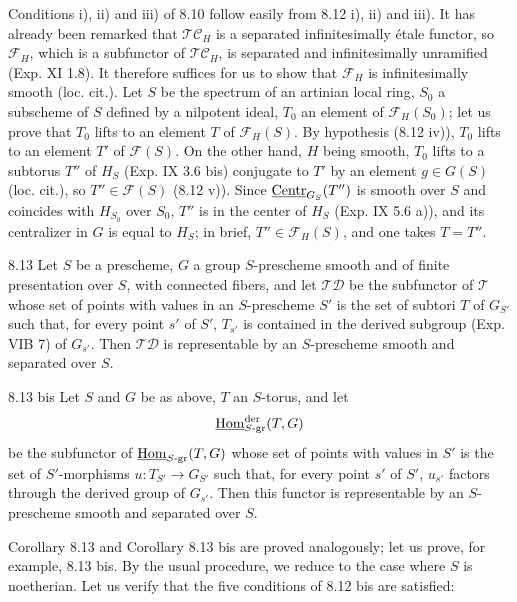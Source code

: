 Conditions i), ii) and iii) of 8.10 follow easily from 8.12 i), ii) and iii). It has already been remarked that $\mathscr{TC}_H$ is a separated infinitesimally étale functor, so $\mathscr F_H$, which is a subfunctor of $\mathscr{TC}_H$, is separated and infinitesimally unramified (Exp. XI 1.8). It therefore suffices for us to show that $\mathscr F_H$ is infinitesimally smooth (loc. cit.). Let $S$ be the spectrum of an artinian local ring, $S_0$ a subscheme of $S$ defined by a nilpotent ideal, $T_0$ an element of $\mathscr F_H(S_0)$; let us prove that $T_0$ lifts to an element $T$ of $\mathscr F_H(S)$. By hypothesis (8.12 iv)), $T_0$ lifts to an element $T'$ of $\mathscr F(S)$. On the other hand, $H$ being smooth, $T_0$ lifts to a subtorus $T''$ of $H_S$ (Exp. IX 3.6 bis) conjugate to $T'$ by an element $g\in G(S)$ (loc. cit.), so $T''\in\mathscr F(S)$ (8.12 v)). Since $\underline{\mathrm{Centr}}_{G_S}(T'')$ is smooth over $S$ and coincides with $H_{S_0}$ over $S_0$, $T''$ is in the center of $H_S$ (Exp. IX 5.6 a)), and its centralizer in $G$ is equal to $H_S$; in brief, $T''\in\mathscr F_H(S)$, and one takes $T=T''$.
\begin{corollary}{8.13}\label{XV.8.13}
Let $S$ be a prescheme, $G$ a group $S$-prescheme smooth and of finite presentation over $S$, with connected fibers, and let $\mathscr{TD}$ be the subfunctor of $\mathscr T$ whose set of points with values in an $S$-prescheme $S'$ is the set of subtori $T$ of $G_{S'}$ such that, for every point $s'$ of $S'$, $T_{s'}$ is contained in the derived subgroup (Exp. VIB 7) of $G_{s'}$. Then $\mathscr{TD}$ is representable by an $S$-prescheme smooth and separated over $S$.
\end{corollary}
\begin{corollary}{8.13 bis}\label{XV.8.13bis}
Let $S$ and $G$ be as above, $T$ an $S$-torus, and let
\[
\underline{\operatorname{Hom}}^{\mathrm{der}}_{S\text{-gr}}(T,G)
\]
be the subfunctor of $\underline{\operatorname{Hom}}_{S\text{-gr}}(T,G)$ whose set of points with values in $S'$ is the set of $S'$-morphisms $u:T_{S'}\to G_{S'}$ such that, for every point $s'$ of $S'$, $u_{s'}$ factors through the derived group of $G_{s'}$. Then this functor is representable by an $S$-prescheme smooth and separated over $S$.
\end{corollary}
Corollary 8.13 and Corollary 8.13 bis are proved analogously; let us prove, for example, 8.13 bis. By the usual procedure, we reduce to the case where $S$ is noetherian. Let us verify that the five conditions of 8.12 bis are satisfied:

